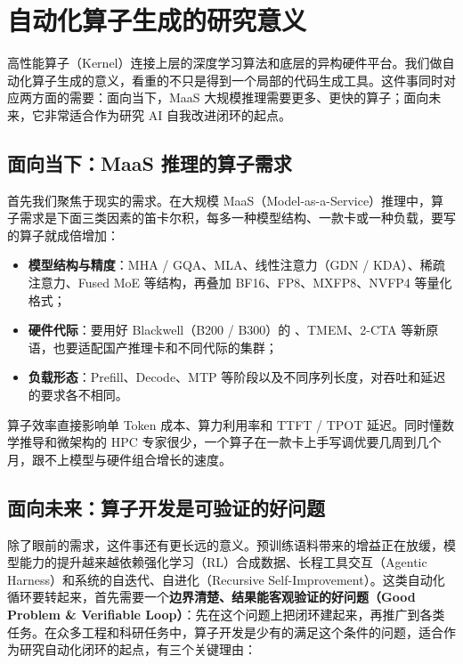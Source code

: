 \ReportContents
\SourceSeparator
\clearpage
\section{自动化算子生成的研究意义}\label{sec:motivation}
高性能算子（Kernel）连接上层的深度学习算法和底层的异构硬件平台。我们做自动化算子生成的意义，看重的不只是得到一个局部的代码生成工具。这件事同时对应两方面的需要：面向当下，MaaS 大规模推理需要更多、更快的算子；面向未来，它非常适合作为研究 AI 自我改进闭环的起点。


\begin{DiagramBlock}
\end{DiagramBlock}
\subsection{面向当下：MaaS 推理的算子需求}\label{sec:maas-demand}
首先我们聚焦于现实的需求。在大规模 MaaS（Model-as-a-Service）推理中，算子需求是下面三类因素的笛卡尔积，每多一种模型结构、一款卡或一种负载，要写的算子就成倍增加：


\begin{itemize}
\item
\textbf{模型结构与精度}：MHA / GQA、MLA、线性注意力（GDN / KDA）、稀疏注意力、Fused MoE 等结构，再叠加 BF16、FP8、MXFP8、NVFP4 等量化格式；


\item
\textbf{硬件代际}：要用好 Blackwell（B200 / B300）的 、TMEM、2-CTA 等新原语，也要适配国产推理卡和不同代际的集群；


\item
\textbf{负载形态}：Prefill、Decode、MTP 等阶段以及不同序列长度，对吞吐和延迟的要求各不相同。


\end{itemize}

算子效率直接影响单 Token 成本、算力利用率和 TTFT / TPOT 延迟。同时懂数学推导和微架构的 HPC 专家很少，一个算子在一款卡上手写调优要几周到几个月，跟不上模型与硬件组合增长的速度。


\subsection{面向未来：算子开发是可验证的好问题}\label{sec:verifiable-loop}
除了眼前的需求，这件事还有更长远的意义。预训练语料带来的增益正在放缓，模型能力的提升越来越依赖强化学习（RL）合成数据、长程工具交互（Agentic Harness）和系统的自迭代、自进化（Recursive Self-Improvement）。这类自动化循环要转起来，首先需要一个\textbf{边界清楚、结果能客观验证的好问题（Good Problem \& Verifiable Loop）}：先在这个问题上把闭环建起来，再推广到各类任务。在众多工程和科研任务中，算子开发是少有的满足这个条件的问题，适合作为研究自动化闭环的起点，有三个关键理由：



